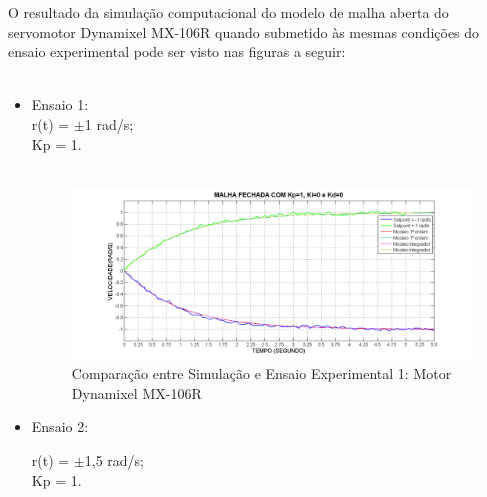 \documentclass[12pt,oneside,a4paper, chapter=TITLE, section = TITLE, english, brazil]{abntex2}
\begin{document}
O resultado da simulação computacional do modelo de malha aberta do servomotor Dynamixel MX-106R quando submetido às mesmas condições do ensaio experimental pode ser visto nas figuras a seguir:
\\
\\

\begin{itemize}

\item Ensaio 1:
\\
r(t) = $\pm$1 rad/s;\\
Kp = 1.\\
\\

\begin{figure}[h] %
\centering
\includegraphics[scale=0.48]{./imagens/Mod_Ensaio1}
\caption[Comparação entre Simulação e Ensaio Experimental 1: Motor Dynamixel MX-106R]{Comparação entre Simulação e Ensaio Experimental 1: Motor Dynamixel MX-106R}
\label{fig:mod_ensaio1}
\end{figure}

\item Ensaio 2:

r(t) = $\pm$1,5 rad/s;\\
Kp = 1.\\


\end{itemize}
\end{document}
